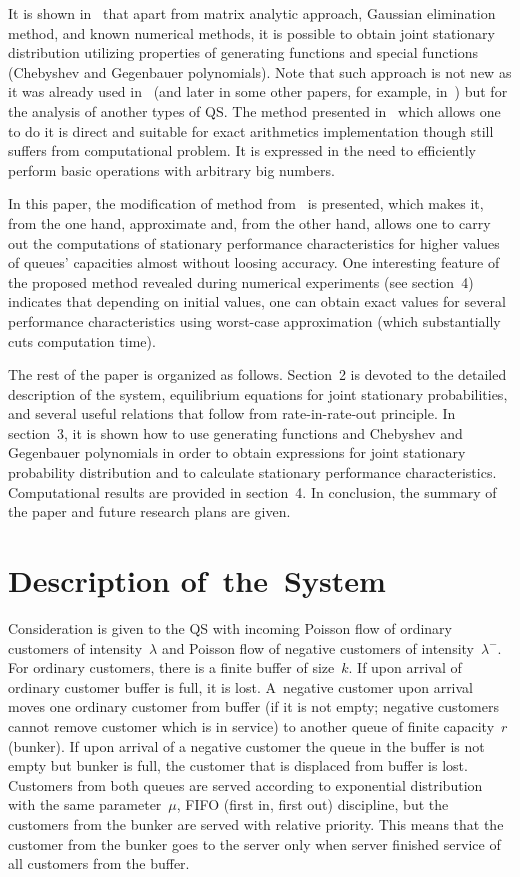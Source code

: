 \begin{multicols}{2}
It is shown in~\cite{aaa6} that apart from matrix analytic approach,
Gaussian elimination method, and known numerical methods,
it is possible to obtain joint stationary distribution
utilizing properties of generating functions
and special functions (Chebyshev and Gegenbauer polynomials).
Note that such approach is not new as it was already used in~\cite{avrach} 
(and later in some other papers, for example, in~\cite{peter})
but for the analysis of another types of QS.
The method presented in~\cite{aaa6}
which allows one to do it is direct and suitable for exact arithmetics implementation
though still suffers from computational problem.
{It is expressed} in the need to efficiently perform basic operations with arbitrary big numbers.

In this paper, the modification of
method from~\cite{aaa6} is presented, which makes it, from the one hand, approximate
and, from the other hand, allows one to carry out the computations
of stationary performance characteristics
for higher values of queues' capacities almost without
loosing accuracy. One interesting feature of the proposed method revealed during numerical
experiments (see section~4) indicates that
depending on initial values, one can obtain exact values for several
performance characteristics using worst-case approximation (which substantially cuts computation time).


The rest of the paper is organized as follows. Section~2 is devoted to
the detailed description of the system, equilibrium equations for
joint stationary probabilities, and several useful relations
that follow from rate-in-rate-out principle.
In section~3, it is shown how to use
generating functions and Chebyshev and Gegenbauer polynomials in order
to obtain expressions for joint stationary probability distribution
and to calculate stationary performance characteristics.
Computational results are provided in section~4. In conclusion,
the summary of the paper and future research plans are given.

\section{Description of~the~System}

\noindent
Consideration is given to the QS with
incoming Poisson flow of ordinary customers of intensity~$\lambda$
and Poisson flow of negative customers of intensity~$\lambda^-$.
For ordinary customers, there is a finite buffer of size~$k$.
If upon arrival of ordinary customer buffer is full, it is lost.
A~negative customer upon arrival moves one ordinary customer from buffer
(if it is not empty; negative customers cannot remove customer which is
in service) to another queue of finite capacity~$r$ (bunker).
If upon arrival of a negative customer the queue in the buffer is not empty but
bunker is full, the customer that is displaced from buffer is lost.
Customers from both queues are served according
to exponential distribution with the same parameter~$\mu$,
FIFO (first in, first out) discipline, but the customers from 
the bunker are served with relative
priority. This means that the customer from the bunker goes to the server
only when server finished service of all customers from the buffer.


\end{multicols}
